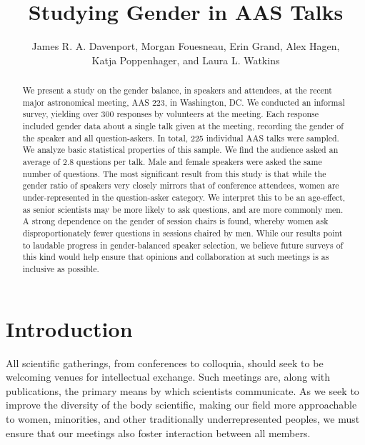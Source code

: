 \documentclass[iop]{emulateapj}
\begin{document}
\title{Studying Gender in AAS Talks}
\author{
	James R. A. Davenport,
	Morgan Fouesneau,
	Erin Grand,
	Alex Hagen,\\
	Katja Poppenhager,
	and Laura L. Watkins
	}



\begin{abstract}
We present a study on the gender balance, in speakers and attendees, at the recent major astronomical meeting, AAS 223, in Washington, DC. We conducted an informal survey, yielding over 300 responses by volunteers at the meeting. Each response included gender data about a single talk given at the meeting, recording the gender of the speaker and all question-askers. In total, 225 individual AAS talks were sampled. We analyze basic statistical properties of this sample. We find the audience asked an average of 2.8 questions per talk. Male and female speakers were asked the same number of questions. The most significant result from this study is that while the gender ratio of speakers very closely mirrors that of conference attendees, women are under-represented in the question-asker category.  We interpret this to be an age-effect, as senior scientists may be more likely to ask questions, and are more commonly men. A strong dependence on the gender of session chairs is found, whereby women ask disproportionately fewer questions in sessions chaired by men. While our results point to laudable progress in gender-balanced speaker selection, we believe future surveys of this kind would help ensure that opinions and collaboration at such meetings is as inclusive as possible.
\end{abstract}




\section{Introduction}
All scientific gatherings, from conferences to colloquia, should seek to be welcoming venues for intellectual exchange. Such meetings are, along with publications, the primary means by which scientists communicate. As we seek to improve the diversity of the body scientific, making our field more approachable to women, minorities, and other traditionally underrepresented peoples, we must ensure that our meetings also foster interaction between all members.
\end{document}
